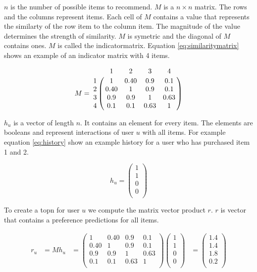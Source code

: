 $n$ is the number of possible items to recommend. $M$ is a $n \times n$ matrix. The rows and the columns represent items. Each cell of $M$ contains a value that represents the similarty of the row item to the column item. The magnitude of the value determines the strength of similarity. $M$ is symetric and the diagonal of $M$ contains ones. $M$ is called the indicatormatrix. Equation \ref{eq:similaritymatrix} shows an example of an indicator matrix with 4 items.

\begin{equation}
  \label{eq:similaritymatrix}
M =\bordermatrix{~ & 1 & 2 & 3 & 4 \cr
 1 & 1  & 0.40 & 0.9 & 0.1 \cr
2 & 0.40 &1  & 0.9 & 0.1 \cr
 3& 0.9 & 0.9 &1  & 0.63 \cr
 4 & 0.1 & 0.1 & 0.63 &1  \cr}
\end{equation}

$h_u$ is a vector of length $n$. It contains an element for every item. The elements are booleans and represent interactions of user $u$ with all items. For example equation \ref{eq:history} show an example history for a user who has purchased item 1 and 2.

\begin{equation}
\label{eq:history}
h_u =
\begin{pmatrix}
 1 \\
 1 \\
 0 \\
 0 \\
\end{pmatrix}
\end{equation}

To create a \gls{topn} for user $u$ we compute the matrix vector product $r$. $r$ is vector that contains a \gls{preference} predictions for all items.

\begin{align}
  \label{eq:recommendation}
r_u &= M h_u 
&=
\begin{pmatrix}
  1  & 0.40 & 0.9 & 0.1 \\
 0.40 &1  & 0.9 & 0.1 \\
  0.9 & 0.9 &1  & 0.63 \\
  0.1 & 0.1 & 0.63 &1 \\  
\end{pmatrix} 
\begin{pmatrix}
 1 \\
 1 \\
 0 \\
 0 \\
\end{pmatrix}
&= 
\begin{pmatrix}
 1.4 \\
 1.4 \\
 1.8 \\
 0.2 \\
\end{pmatrix}
\end{align}

